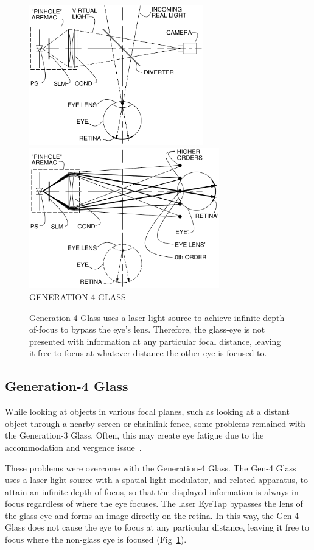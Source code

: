 \begin{figure}
  \includegraphics[height=2.4in]{ch6/figs/GlassGen4a.pdf}
  \includegraphics[height=2.4in]{ch6/figs/GlassGen4b.pdf}\\
  {\sffamily \large GENERATION-4 GLASS}\\
  \caption{Generation-4 Glass uses a laser light source to achieve
           infinite depth-of-focus to bypass the eye's lens.  Therefore,
           the glass-eye is not presented with information at any particular
           focal distance, leaving it free to focus at whatever distance the
           other eye is focused to.}
  \label{fig:genfour}
\end{figure}

\subsection{Generation-4 Glass}
While looking at objects in various focal planes, such as looking at a distant object through a nearby 
screen or chainlink fence, some problems remained with the Generation-3 Glass. Often, this may 
create eye fatigue due to the accommodation and vergence issue~\cite{hoffman2008vergence}. 

These problems were overcome with the Generation-4 Glass.  The Gen-4 Glass uses a laser light 
source
with a spatial light modulator, and related apparatus, to attain an infinite depth-of-focus, so that the 
displayed information is always in focus regardless of where the eye focuses. The laser EyeTap 
bypasses the lens of the glass-eye and forms an image directly on the retina. In this way, the Gen-4 
Glass does not cause the eye to focus at any particular distance, leaving it free to focus where the 
non-glass eye is focused (Fig~\ref{fig:genfour}).

